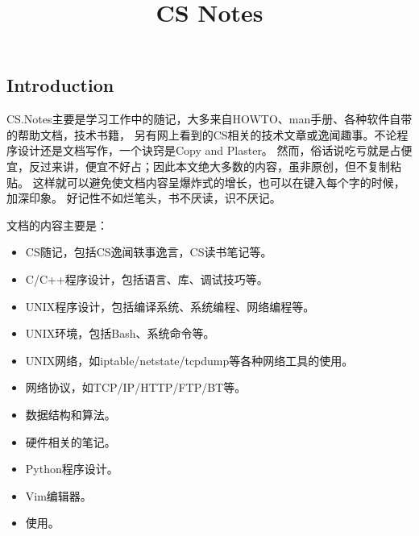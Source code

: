 \documentclass[a4paper,11pt,oneside,openany]{book}
\title{\huge \bfseries CS Notes}
\begin{document}
\begin{CJK*}{GBK}{song}

\maketitle

\clearpage      %
{}    %

\tableofcontents


\setlength{\parskip}{1ex plus 0.5ex minus 0.2ex}    %


\chapter{Introduction}
CS.Notes主要是学习工作中的随记，大多来自HOWTO、man手册、各种软件自带的帮助文档，技术书籍，
另有网上看到的CS相关的技术文章或逸闻趣事。不论程序设计还是文档写作，一个诀窍是Copy and Plaster。
然而，俗话说吃亏就是占便宜，反过来讲，便宜不好占；因此本文绝大多数的内容，虽非原创，但不复制粘贴。
这样就可以避免使文档内容呈爆炸式的增长，也可以在键入每个字的时候，加深印象。
好记性不如烂笔头，书不厌读，识不厌记。

文档的内容主要是：
\begin{itemize}
\item CS随记，包括CS逸闻轶事逸言，CS读书笔记等。
\item C/C++程序设计，包括语言、库、调试技巧等。
\item UNIX程序设计，包括编译系统、系统编程、网络编程等。
\item UNIX环境，包括Bash、系统命令等。
\item UNIX网络，如iptable/netstate/tcpdump等各种网络工具的使用。
\item 网络协议，如TCP/IP/HTTP/FTP/BT等。
\item 数据结构和算法。
\item 硬件相关的笔记。
\item Python程序设计。
\item Vim编辑器。
\item 使用。
\end{itemize}


\end{CJK*}
\end{document}
